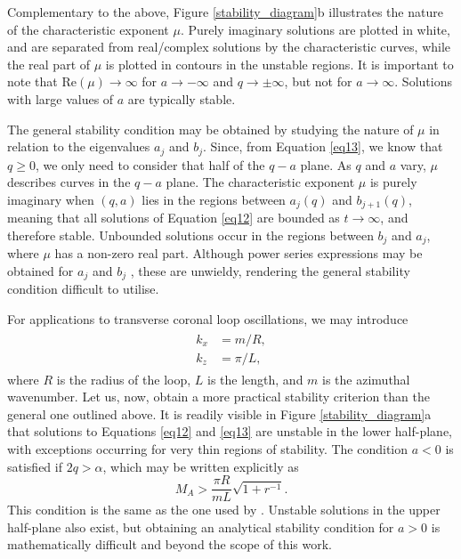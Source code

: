 \documentclass[12pt]{ociamthesis}
\begin{document}
Complementary to the above, Figure \ref{stability_diagram}b illustrates the nature of the characteristic exponent $\mu$.
Purely imaginary solutions are plotted in white, and are separated from real/complex solutions by the characteristic curves, while the real part of $\mu$ is plotted in contours in the unstable regions.
It is important to note that $\mathrm{Re}(\mu) \to \infty$ for $a \to -\infty$ and $q \to \pm \infty$, but not for $a \to \infty$.
Solutions with large values of $a$ are typically stable.

The general stability condition may be obtained by studying the nature of $\mu$ in relation to the eigenvalues $a_j$ and $b_j$.
Since, from Equation \eqref{eq13}, we know that $q \geq 0$, we only need to consider that half of the $q-a$ plane.
As $q$ and $a$ vary, $\mu$ describes curves in the $q-a$ plane.
The characteristic exponent $\mu$ is purely imaginary when $(q, a)$ lies in the regions between $a_j(q)$ and $b_{j+1} (q)$, meaning that all solutions of Equation \eqref{eq12} are bounded as $t \to \infty$, and therefore stable.
Unbounded solutions occur in the regions between $b_j$ and $a_j$, where $\mu$ has a non-zero real part.
Although power series expressions may be obtained for $a_j$ and $b_j$ \citep{McLachlan1946}, these are unwieldy, rendering the general stability condition difficult to utilise.

For applications to transverse coronal loop oscillations, we may introduce 
\begin{align}
\begin{split}
\label{loop_params}
k_x & = m / R,
\\[0.3cm]
k_z & = \pi / L,
\end{split}
\end{align}
where $R$ is the radius of the loop, $L$ is the length, and $m$ is the azimuthal wavenumber.
Let us, now, obtain a more practical stability criterion than the general one outlined above.
It is readily visible in Figure \ref{stability_diagram}a that solutions to Equations \eqref{eq12} and \eqref{eq13} are unstable in the lower half-plane, with exceptions occurring for very thin regions of stability.
The condition $a < 0$ is satisfied if $2q > \alpha$, which may be written explicitly as
\begin{equation}
\label{eq15}
M_A > \frac{\pi R}{m L} \sqrt{1 + r^{-1}}.
\end{equation}
This condition is the same as the one used by \cite{Antolin2014}.
Unstable solutions in the upper half-plane also exist, but obtaining an analytical stability condition for $a > 0$ is mathematically difficult and beyond the scope of this work.
\end{document}
